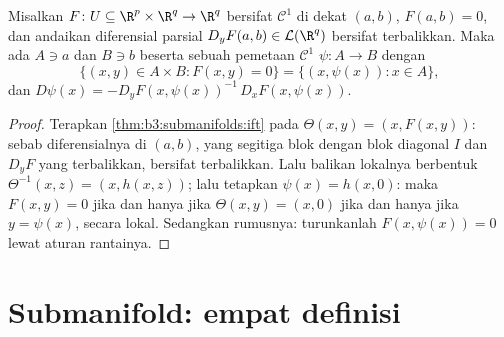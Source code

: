 \begin{theorem}
\label{thm:b3:submanifolds:implicit}
Misalkan $F \colon U \subseteq \R^p\times\R^q \to \R^q$ bersifat
$\mathcal C^1$ di dekat $(a, b)$, $F(a,b) = 0$, dan andaikan
diferensial parsial $D_yF(a,b) \in \mathcal L(\R^q)$ bersifat
terbalikkan. Maka ada  $A \ni a$ dan $B \ni b$
beserta sebuah pemetaan $\mathcal C^1$ $\psi \colon A \to B$ dengan
\[
\bigl\{(x, y)\in A\times B : F(x,y) = 0\bigr\}
= \{(x, \psi(x)) : x \in A\},
\]
dan $D\psi(x) = -D_yF(x, \psi(x))^{-1}\,D_xF(x,
\psi(x))$.
\end{theorem}

\begin{proof}
Terapkan \cref{thm:b3:submanifolds:ift} pada $\Theta(x, y) = (x,
F(x,y))$: sebab diferensialnya di $(a,b)$, yang segitiga blok dengan
blok diagonal $I$ dan $D_yF$ yang terbalikkan, bersifat terbalikkan. Lalu
balikan lokalnya berbentuk $\Theta^{-1}(x, z) = (x, h(x,
z))$; lalu tetapkan $\psi(x) = h(x, 0)$: maka $F(x, y) = 0$ jika dan hanya jika
$\Theta(x,y) = (x, 0)$ jika dan hanya jika $y = \psi(x)$, secara lokal. Sedangkan
rumusnya: turunkanlah $F(x, \psi(x)) = 0$ lewat aturan
rantainya.
\end{proof}

\section{Submanifold: empat definisi}

